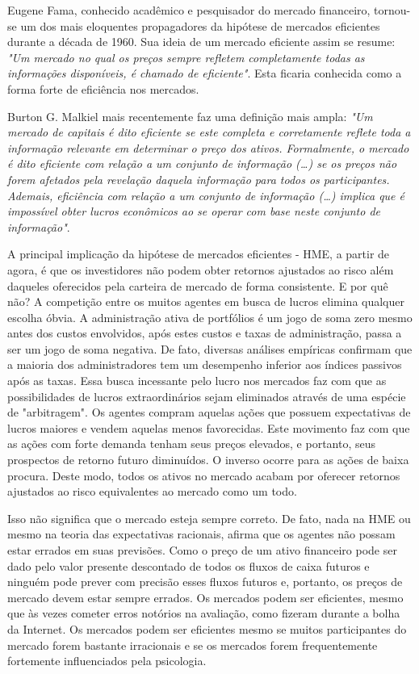 Eugene Fama, conhecido acadêmico e pesquisador do mercado financeiro, tornou-se um dos mais eloquentes propagadores da hipótese de mercados eficientes durante a década de 1960. Sua ideia de um mercado eficiente assim se resume: \emph{"Um mercado no qual os preços sempre refletem completamente todas as informações disponíveis, é chamado de eficiente"}. Esta ficaria conhecida como a forma forte de eficiência nos mercados.

Burton G. Malkiel mais recentemente faz uma definição mais ampla: \emph{"Um mercado de capitais é dito eficiente se este completa e corretamente reflete toda a informação relevante em determinar o preço dos ativos. Formalmente, o mercado é dito eficiente com relação a um conjunto de informação (\ldots) se os preços não forem afetados pela revelação daquela informação para todos os participantes. Ademais, eficiência com relação a um conjunto de informação (\ldots) implica que é impossível obter lucros econômicos ao se operar com base neste conjunto de informação"}.

A principal implicação da hipótese de mercados eficientes - HME, a partir de agora, é que os investidores não podem obter retornos ajustados ao risco além daqueles oferecidos pela carteira de mercado de forma consistente. E por quê não? A competição entre os muitos agentes em busca de lucros elimina qualquer escolha óbvia. A administração ativa de portfólios é um jogo de soma zero mesmo antes dos custos envolvidos, após estes custos e taxas de administração, passa a ser um jogo de soma negativa. De fato, diversas análises empíricas confirmam que a maioria dos administradores tem um desempenho inferior aos índices passivos após as taxas. Essa busca incessante pelo lucro nos mercados faz com que as possibilidades de lucros extraordinários sejam eliminados através de uma espécie de "arbitragem". Os agentes compram aquelas ações que possuem expectativas de lucros maiores e vendem aquelas menos favorecidas. Este movimento faz com que as ações com forte demanda tenham seus preços elevados, e portanto, seus prospectos de retorno futuro diminuídos. O inverso ocorre para as ações de baixa procura. Deste modo, todos os ativos no mercado acabam por oferecer retornos ajustados ao risco equivalentes ao mercado como um todo.

Isso não significa que o mercado esteja sempre correto. De fato, nada na HME ou mesmo na teoria das expectativas racionais, afirma que os agentes não possam estar errados em suas previsões. Como o preço de um ativo financeiro pode ser dado pelo valor presente descontado de todos os fluxos de caixa futuros e ninguém pode prever com precisão esses fluxos futuros e, portanto, os preços de mercado devem estar sempre errados. Os mercados podem ser eficientes, mesmo que às vezes cometer erros notórios na avaliação, como fizeram durante a bolha da Internet. Os mercados podem ser eficientes mesmo se muitos participantes do mercado forem bastante irracionais e se os mercados forem frequentemente fortemente influenciados pela psicologia.

